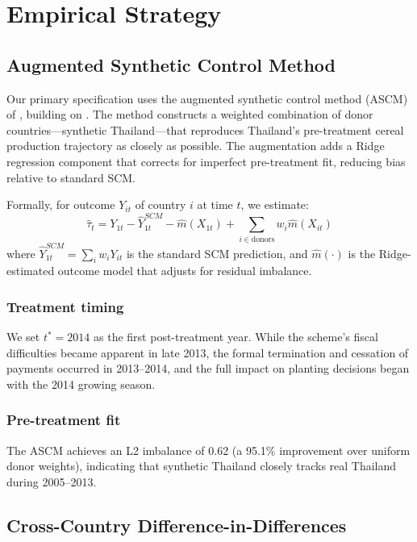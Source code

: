 \documentclass[12pt]{article}
\begin{document}


\section{Empirical Strategy}\label{sec:method}

\subsection{Augmented Synthetic Control Method}

Our primary specification uses the augmented synthetic control method (ASCM) of \citet{ben2021augmented}, building on \citet{abadie2010}. The method constructs a weighted combination of donor countries---synthetic Thailand---that reproduces Thailand's pre-treatment cereal production trajectory as closely as possible. The augmentation adds a Ridge regression component that corrects for imperfect pre-treatment fit, reducing bias relative to standard SCM.

Formally, for outcome $Y_{it}$ of country $i$ at time $t$, we estimate:
\begin{equation}
\hat{\tau}_t = Y_{1t} - \hat{Y}_{1t}^{SCM} - \hat{m}(X_{1t}) + \sum_{i \in \text{donors}} w_i \hat{m}(X_{it})
\end{equation}
where $\hat{Y}_{1t}^{SCM} = \sum_{i} w_i Y_{it}$ is the standard SCM prediction, and $\hat{m}(\cdot)$ is the Ridge-estimated outcome model that adjusts for residual imbalance.

\subsubsection*{Treatment timing} We set $t^* = 2014$ as the first post-treatment year. While the scheme's fiscal difficulties became apparent in late 2013, the formal termination and cessation of payments occurred in 2013--2014, and the full impact on planting decisions began with the 2014 growing season.

\subsubsection*{Pre-treatment fit} The ASCM achieves an L2 imbalance of 0.62 (a 95.1\% improvement over uniform donor weights), indicating that synthetic Thailand closely tracks real Thailand during 2005--2013.

\subsection{Cross-Country Difference-in-Differences}
\end{document}
